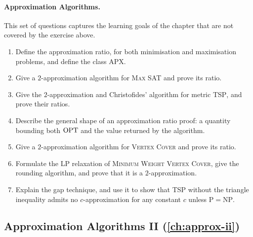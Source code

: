 \paragraph{Approximation Algorithms.}
This set of questions captures the learning goals of the chapter that are not
covered by the exercise above.
\begin{enumerate}
  \item Define the approximation ratio, for both minimisation and maximisation
        problems, and define the class APX.
  \item Give a $2$-approximation algorithm for \textsc{Max SAT} and prove its
        ratio.
  \item Give the $2$-approximation and Christofides' algorithm for metric
        \textsc{TSP}, and prove their ratios.
  \item Describe the general shape of an approximation ratio proof: a quantity
        bounding both $\mathrm{OPT}$ and the value returned by the algorithm.
  \item Give a $2$-approximation algorithm for \textsc{Vertex Cover} and prove
        its ratio.
  \item Formulate the LP relaxation of \textsc{Minimum Weight Vertex Cover},
        give the rounding algorithm, and prove that it is a $2$-approximation.
  \item Explain the gap technique, and use it to show that \textsc{TSP} without
        the triangle inequality admits no $c$-approximation for any constant
        $c$ unless $\mathrm{P} = \mathrm{NP}$.
\end{enumerate}

\subsection*{Approximation Algorithms II (\cref{ch:approx-ii})}

